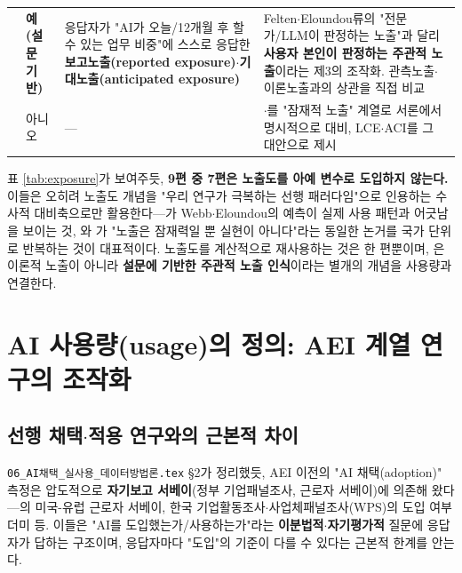 \documentclass[11pt]{article}
\begin{document}
\begin{longtable}{L{3.0cm}L{2.0cm}L{4.0cm}L{6.6cm}}
\textbf{\citet{massenkoff-2026-cadences}} & \textbf{예(설문 기반)} &
응답자가 "AI가 오늘/12개월 후 할 수 있는 업무 비중"에 스스로 응답한 \textbf{보고노출(reported exposure)$\cdot$기대노출(anticipated exposure)} &
Felten$\cdot$Eloundou류의 "전문가/LLM이 판정하는 노출"과 달리 \textbf{사용자 본인이 판정하는 주관적 노출}이라는 제3의 조작화. 관측노출$\cdot$이론노출과의 상관을 직접 비교\\

\citet{fan-2026-aggregate-gains-from-ai} & 아니오 & --- &
\citet{felten-2021-occupational-industry-and-geographic-exposure}$\cdot$\citet{eloundou-2023-gpts-are-gpts-an-early}를 "잠재적 노출" 계열로 서론에서 명시적으로 대비, LCE$\cdot$ACI를 그 대안으로 제시\\
\end{longtable}

표 \ref{tab:exposure}가 보여주듯, \textbf{9편 중 7편은 노출도를 아예 변수로 도입하지 않는다.} 이들은 오히려 노출도 개념을 "우리 연구가 극복하는 선행 패러다임"으로 인용하는 수사적 대비축으로만 활용한다—\citet{handa-2025-which-economic-tasks-are}가 Webb$\cdot$Eloundou의 예측이 실제 사용 패턴과 어긋남을 보이는 것, \citet{fan-2026-what-countries-use-ai-and}와 \citet{fan-2026-aggregate-gains-from-ai}가 "노출은 잠재력일 뿐 실현이 아니다"라는 동일한 논거를 국가 단위로 반복하는 것이 대표적이다. 노출도를 계산적으로 재사용하는 것은 \citet{massenkoff-2026-labor-market-impacts-of-ai} 한 편뿐이며, \citet{massenkoff-2026-cadences}은 이론적 노출이 아니라 \textbf{설문에 기반한 주관적 노출 인식}이라는 별개의 개념을 사용량과 연결한다.

\section{AI 사용량(usage)의 정의: AEI 계열 연구의 조작화}
\label{sec:usage}

\subsection{선행 채택$\cdot$적용 연구와의 근본적 차이}

\texttt{06\_AI채택\_실사용\_데이터방법론.tex} \S2가 정리했듯, AEI 이전의 "AI 채택(adoption)" 측정은 압도적으로 \textbf{자기보고 서베이}(정부 기업패널조사, 근로자 서베이)에 의존해 왔다—\citet{bick-2026-mind-the-gap-ai-adoption}의 미국-유럽 근로자 서베이, 한국 기업활동조사$\cdot$사업체패널조사(WPS)의 도입 여부 더미 등. 이들은 "AI를 도입했는가/사용하는가"라는 \textbf{이분법적$\cdot$자기평가적} 질문에 응답자가 답하는 구조이며, 응답자마다 "도입"의 기준이 다를 수 있다는 근본적 한계를 안는다.
\end{document}
